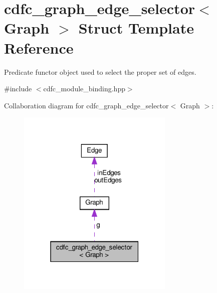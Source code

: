 \hypertarget{structcdfc__graph__edge__selector}{}\section{cdfc\+\_\+graph\+\_\+edge\+\_\+selector$<$ Graph $>$ Struct Template Reference}
\label{structcdfc__graph__edge__selector}


Predicate functor object used to select the proper set of edges.  




{\ttfamily \#include $<$cdfc\+\_\+module\+\_\+binding.\+hpp$>$}



Collaboration diagram for cdfc\+\_\+graph\+\_\+edge\+\_\+selector$<$ Graph $>$\+:
\nopagebreak
\begin{figure}[H]
\begin{center}
\leavevmode
\includegraphics[width=211pt]{d8/dbd/structcdfc__graph__edge__selector__coll__graph}
\end{center}
\end{figure}
